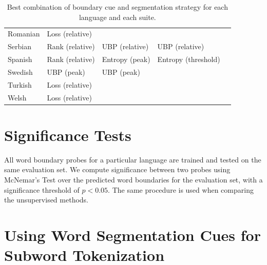 \begin{table}[t]
\begin{tabular}{lllll}
    Romanian & Loss (relative) &  &  &  \\
    Serbian & Rank (relative) & UBP (relative) & UBP (relative) &  \\
    Spanish & Rank (relative) & Entropy (peak) & Entropy (threshold) &  \\
    Swedish & UBP (peak) & UBP (peak) &  &  \\
    Turkish & Loss (relative) &  &  &  \\
    Welsh & Loss (relative) &  &  &  \\
    \bottomrule
    \end{tabular}
    \caption{Best combination of boundary cue and segmentation strategy for each language and each suite.}
    \label{tab:15-bestcuesfull}
\end{table}

\section{Significance Tests}\label{app:15-significance}

All word boundary probes for a particular language are trained and tested on the same evaluation set. We compute significance between two probes using McNemar’s Test \citep{McNemar_1947} over the predicted word boundaries for the evaluation set, with a significance threshold of $p<0.05$. The same procedure is used when comparing the unsupervised methods.



\section{Using Word Segmentation Cues for Subword Tokenization}\label{app:15-tokenizers}

